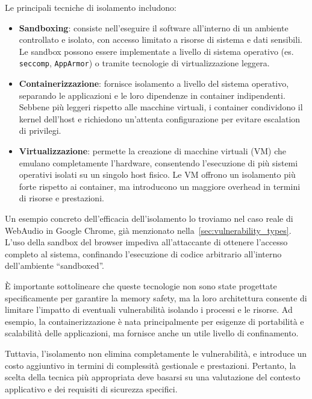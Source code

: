 Le principali tecniche di isolamento includono:
\begin{itemize}
  \item \textbf{Sandboxing}: consiste nell'eseguire il software all'interno di un
    ambiente controllato e isolato, con accesso limitato a risorse di sistema e
    dati sensibili. Le sandbox possono essere implementate a livello di sistema operativo
    (es. \texttt{seccomp}, \texttt{AppArmor}) o tramite tecnologie di virtualizzazione
    leggera.

  \item \textbf{Containerizzazione}: fornisce isolamento a livello del sistema operativo,
    separando le applicazioni e le loro dipendenze in container indipendenti. Sebbene
    più leggeri rispetto alle macchine virtuali, i container condividono il
    kernel dell'host e richiedono un'attenta configurazione per evitare
    escalation di privilegi.

  \item \textbf{Virtualizzazione}: permette la creazione di macchine virtuali (VM)
    che emulano completamente l'hardware, consentendo l'esecuzione di più
    sistemi operativi isolati su un singolo host fisico. Le VM offrono un isolamento
    più forte rispetto ai container, ma introducono un maggiore overhead in
    termini di risorse e prestazioni.
\end{itemize}

Un esempio concreto dell'efficacia dell'isolamento lo troviamo nel caso reale di
WebAudio in Google Chrome, già menzionato nella~\autoref{sec:vulnerability_types}.
L'uso della sandbox del browser impediva all'attaccante di ottenere l'accesso
completo al sistema, confinando l'esecuzione di codice arbitrario all'interno dell'ambiente
``sandboxed''.~\cite{webaudio_uaf}

È importante sottolineare che queste tecnologie non sono state progettate specificamente
per garantire la memory safety, ma la loro architettura consente di limitare l'impatto
di eventuali vulnerabilità isolando i processi e le risorse. Ad esempio, la
containerizzazione è nata principalmente per esigenze di portabilità e
scalabilità delle applicazioni, ma fornisce anche un utile livello di confinamento.

Tuttavia, l'isolamento non elimina completamente le vulnerabilità, e introduce un
costo aggiuntivo in termini di complessità gestionale e prestazioni. Pertanto, la
scelta della tecnica più appropriata deve basarsi su una valutazione del contesto
applicativo e dei requisiti di sicurezza specifici.